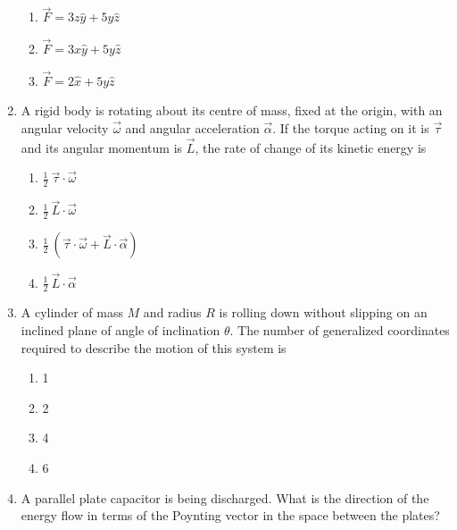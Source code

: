 \documentclass[journal,12pt,onecolumn]{IEEEtran}
\theoremstyle{remark}
\begin{document}
\begin{enumerate}
\begin{multicols}{2}
\begin{enumerate}
\item  $\overrightarrow{F} = 3z\hat{y} + 5y\hat{z}$

\item  $\overrightarrow{F} = 3x\hat{y} + 5y\hat{z}$

\item $\overrightarrow{F} = 2\hat{x} + 5y\hat{z}$
\end{enumerate}
    \end{multicols}
    \item A rigid body is rotating about its centre of mass, fixed at the origin, with an angular velocity $\vec{\omega}$ and angular acceleration $\vec{\alpha}$. If the torque acting on it is $\vec{\tau}$ and its angular momentum is $\vec{L}$, the rate of change of its kinetic energy is
    \hfill{}
\begin{multicols}{4}
    \begin{enumerate}

\item  $\frac{1}{2} \ \vec{\tau} \cdot \vec{\omega} $ 

\item $ \frac{1}{2} \ \vec{L} \cdot \vec{\omega} $

\item $\frac{1}{2} \ (\vec{\tau} \cdot \vec{\omega} + \vec{L} \cdot \vec{\alpha}) $
\item $ \frac{1}{2} \ \vec{L} \cdot \vec{\alpha}$
\end{enumerate}
    \end{multicols}
\item A cylinder of mass $M$ and radius $R$ is rolling down without slipping on an inclined plane of angle of inclination $\theta$. The number of generalized coordinates required to describe the motion of this system is
\hfill{}
\begin{multicols}{4}
    \begin{enumerate}

\item  1
\item  2
\item  4 
\item  6
\end{enumerate}
    \end{multicols}
\item A parallel plate capacitor is being discharged. What is the direction of the energy flow in terms of the Poynting vector in the space between the plates?


\end{enumerate}
\end{document}
